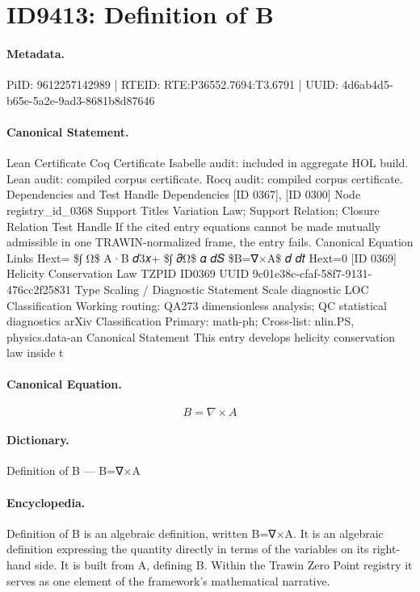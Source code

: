\section*{ID9413: Definition of B}
\paragraph{Metadata.}
PiID: 9612257142989 | RTEID: RTE:P36552.7694:T3.6791 | UUID: 4d6ab4d5-b65e-5a2e-9ad3-8681b8d87646

\paragraph{Canonical Statement.}
Lean Certificate Coq Certificate Isabelle audit: included in aggregate HOL build. Lean audit: compiled corpus certificate. Rocq audit: compiled corpus certificate. Dependencies and Test Handle Dependencies [ID 0367], [ID 0300] Node registry\_id\_0368 Support Titles Variation Law; Support Relation; Closure Relation Test Handle If the cited entry equations cannot be made mutually admissible in one TRAWIN-normalized frame, the entry fails. Canonical Equation Links Hext= \$∫ Ω\$ A·B 𝑑3𝑥+ \$∫ 𝜕Ω\$ 𝛼 𝑑𝑆 \$B=∇×A\$ 𝑑 𝑑𝑡 Hext=0 [ID 0369] Helicity Conservation Law TZPID ID0369 UUID 9c01e38c-cfaf-58f7-9131-476cc2f25831 Type Scaling / Diagnostic Statement Scale diagnostic LOC Classification Working routing: QA273 dimensionless analysis; QC statistical diagnostics arXiv Classification Primary: math-ph; Cross-list: nlin.PS, physics.data-an Canonical Statement This entry develops helicity conservation law inside t

\paragraph{Canonical Equation.}
\[
B=∇×A
\]

\paragraph{Dictionary.}
Definition of B — B=∇×A

\paragraph{Encyclopedia.}
Definition of B is an algebraic definition, written B=∇×A. It is an algebraic definition expressing the quantity directly in terms of the variables on its right-hand side. It is built from A, defining B. Within the Trawin Zero Point registry it serves as one element of the framework's mathematical narrative.
